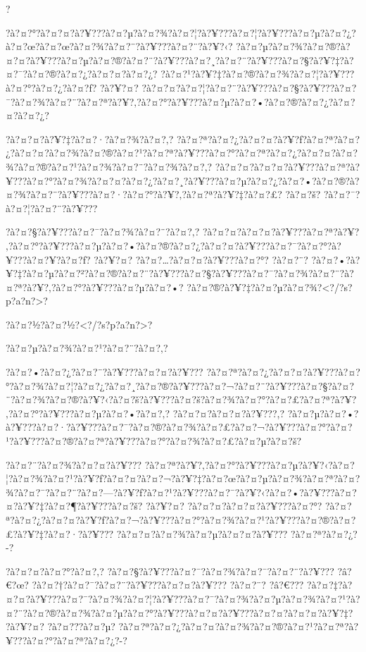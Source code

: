 \documentclass[11pt, openany]{book}
\begin{document}
{{{{{{{{{{?

?à?¤?°?à?¤?¤?à?¥???à?¤?µ?à?¤?¾?à?¤?¦?à?¥???à?¤?¦?à?¥???à?¤?µ?à?¤?¿?à?¤?œ?à?¤?œ?à?¤?¾?à?¤?¨?à?¥???à?¤?¨?à?¥?‹?
?à?¤?µ?à?¤?¾?à?¤?®?à?¤?¤?à?¥???à?¤?µ?à?¤?®?à?¤?¨?à?¥???à?¤?¸?à?¤?¨?à?¥???à?¤?§?à?¥?‡?à?¤?¯?à?¤?®?à?¤?¿?à?¤?¤?à?¤?¿?
?à?¤?¹?à?¥?‡?à?¤?®?à?¤?¾?à?¤?¦?à?¥???à?¤?°?à?¤?¿?à?¤?ƒ? ?à?¥?¤?
?à?¤?¤?à?¤?¦?à?¤?¨?à?¥???à?¤?§?à?¥???à?¤?¯?à?¤?¾?à?¤?¨?à?¤?ª?à?¥?‚?à?¤?°?à?¥???à?¤?µ?à?¤?•?à?¤?®?à?¤?¿?à?¤?¤?à?¤?¿?

?à?¤?¤?à?¥?‡?à?¤?·?à?¤?¾?à?¤?‚?
?à?¤?ª?à?¤?¿?à?¤?¤?à?¥?ƒ?à?¤?ª?à?¤?¿?à?¤?¤?à?¤?¾?à?¤?®?à?¤?¹?à?¤?ª?à?¥???à?¤?°?à?¤?ª?à?¤?¿?à?¤?¤?à?¤?¾?à?¤?®?à?¤?¹?à?¤?¾?à?¤?¨?à?¤?¾?à?¤?‚?
?à?¤?¤?à?¤?¤?à?¥???à?¤?ª?à?¥???à?¤?°?à?¤?¾?à?¤?¤?à?¤?¿?à?¤?¸?à?¥???à?¤?µ?à?¤?¿?à?¤?•?à?¤?®?à?¤?¾?à?¤?¨?à?¥???à?¤?·?à?¤?°?à?¥?‚?à?¤?ª?à?¥?‡?à?¤?£?
?à?¤?š? ?à?¤?¯?à?¤?¦?à?¤?¨?à?¥???

?à?¤?§?à?¥???à?¤?¯?à?¤?¾?à?¤?¨?à?¤?‚?
?à?¤?¤?à?¤?¤?à?¥???à?¤?ª?à?¥?‚?à?¤?°?à?¥???à?¤?µ?à?¤?•?à?¤?®?à?¤?¿?à?¤?¤?à?¥???à?¤?¯?à?¤?°?à?¥???à?¤?¥?à?¤?ƒ?
?à?¥?¤? ?à?¤?\ldots{}?à?¤?¤?à?¥???à?¤?°? ?à?¤?¨?
?à?¤?•?à?¥?‡?à?¤?µ?à?¤?²?à?¤?®?à?¤?¨?à?¥???à?¤?§?à?¥???à?¤?¯?à?¤?¾?à?¤?¨?à?¤?ª?à?¥?‚?à?¤?°?à?¥???à?¤?µ?à?¤?•?
?à?¤?®?à?¥?‡?à?¤?µ?à?¤?¾?\textless{}?/?s?p?a?n?\textgreater{}?

?à?¤?½?à?¤?½?\textless{}?/?s?p?a?n?\textgreater{}?

?à?¤?µ?à?¤?¾?à?¤?¹?à?¤?¨?à?¤?‚?

?à?¤?•?à?¤?¿?à?¤?¨?à?¥???à?¤?¤?à?¥???
?à?¤?ª?à?¤?¿?à?¤?¤?à?¥???à?¤?°?à?¤?¾?à?¤?¦?à?¤?¿?à?¤?¸?à?¤?®?à?¥???à?¤?¬?à?¤?¨?à?¥???à?¤?§?à?¤?¨?à?¤?¾?à?¤?®?à?¥?‹?à?¤?š?à?¥???à?¤?š?à?¤?¾?à?¤?°?à?¤?£?à?¤?ª?à?¥?‚?à?¤?°?à?¥???à?¤?µ?à?¤?•?à?¤?‚?
?à?¤?¤?à?¤?¤?à?¥???,?
?à?¤?µ?à?¤?•?à?¥???à?¤?·?à?¥???à?¤?¯?à?¤?®?à?¤?¾?à?¤?£?à?¤?¬?à?¥???à?¤?°?à?¤?¹?à?¥???à?¤?®?à?¤?ª?à?¥???à?¤?°?à?¤?¾?à?¤?£?à?¤?µ?à?¤?š?

?à?¤?¨?à?¤?¾?à?¤?¤?à?¥???
?à?¤?ª?à?¥?‚?à?¤?°?à?¥???à?¤?µ?à?¥?‹?à?¤?¦?à?¤?¾?à?¤?¹?à?¥?ƒ?à?¤?¤?à?¤?¬?à?¥?‡?à?¤?œ?à?¤?µ?à?¤?¾?à?¤?ª?à?¤?¾?à?¤?¯?à?¤?¨?à?¤?---?à?¥?ƒ?à?¤?¹?à?¥???à?¤?¯?à?¥?‹?à?¤?•?à?¥???à?¤?¤?à?¥?‡?à?¤?¶?à?¥???à?¤?š?
?à?¥?¤? ?à?¤?¤?à?¤?¤?à?¥???à?¤?°?
?à?¤?ª?à?¤?¿?à?¤?¤?à?¥?ƒ?à?¤?¬?à?¥???à?¤?°?à?¤?¾?à?¤?¹?à?¥???à?¤?®?à?¤?£?à?¥?‡?à?¤?·?à?¥???
?à?¤?¤?à?¤?¾?à?¤?µ?à?¤?¤?à?¥??? ?à?¤?ª?à?¤?¿?-?

?à?¤?¤?à?¤?°?à?¤?‚? ?à?¤?§?à?¥???à?¤?¯?à?¤?¾?à?¤?¯?à?¤?¨?à?¥??? ?â?€?œ?
?à?¤?†?à?¤?¯?à?¤?¨?à?¥???à?¤?¤?à?¥??? ?à?¤?¨? ?â?€???
?à?¤?‡?à?¤?¤?à?¥???à?¤?¯?à?¤?¾?à?¤?¦?à?¥???à?¤?¯?à?¤?¾?à?¤?µ?à?¤?¾?à?¤?¹?à?¤?¨?à?¤?®?à?¤?¾?à?¤?µ?à?¤?°?à?¥???à?¤?¤?à?¥???à?¤?¤?à?¤?¤?à?¥?‡?
?à?¥?¤? ?à?¤???à?¤?µ?
?à?¤?ª?à?¤?¿?à?¤?¤?à?¤?¾?à?¤?®?à?¤?¹?à?¤?ª?à?¥???à?¤?°?à?¤?ª?à?¤?¿?-?

}}}}}}}}}}
\end{document}
